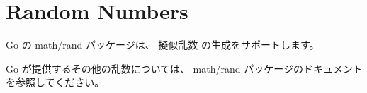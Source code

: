 \section{Random Numbers}

Go の math/rand パッケージは、 擬似乱数 の生成をサポートします。




Go が提供するその他の乱数については、 math/rand パッケージのドキュメントを参照してください。